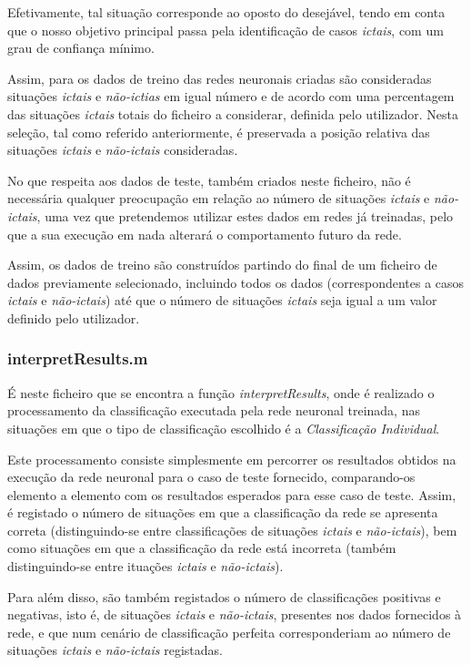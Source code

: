 \documentclass{article}
\begin{document}
Efetivamente, tal situação corresponde ao oposto do desejável, tendo em conta que o nosso objetivo principal passa pela identificação de casos \emph{ictais}, com um grau de confiança mínimo.

Assim, para os dados de treino das redes neuronais criadas são consideradas situações \emph{ictais} e \emph{não-ictias} em igual número e de acordo com uma percentagem das situações \emph{ictais} totais do ficheiro a considerar, definida pelo utilizador. Nesta seleção, tal como referido anteriormente, é preservada a posição relativa das situações \emph{ictais} e \emph{não-ictais} consideradas.

No que respeita aos dados de teste, também criados neste ficheiro, não é necessária qualquer preocupação em relação ao número de situações \emph{ictais} e \emph{não-ictais}, uma vez que pretendemos utilizar estes dados em redes já treinadas, pelo que a sua execução em nada alterará o comportamento futuro da rede.

Assim, os dados de treino são construídos partindo do final de um ficheiro de dados previamente selecionado, incluindo todos os dados (correspondentes a casos \emph{ictais} e \emph{não-ictais}) até que o número de situações \emph{ictais} seja igual a um valor definido pelo utilizador.

\subsubsection{interpretResults.m}

É neste ficheiro que se encontra a função \emph{interpretResults}, onde é realizado o processamento da classificação executada pela rede neuronal treinada, nas situações em que o tipo de classificação escolhido é a \emph{Classificação Individual}.

Este processamento consiste simplesmente em percorrer os resultados obtidos na execução da rede neuronal para o caso de teste fornecido, comparando-os elemento a elemento com os resultados esperados para esse caso de teste. Assim, é registado o número de situações em que a classificação da rede se apresenta correta (distinguindo-se entre classificações de situações \emph{ictais} e \emph{não-ictais}), bem como situações em que a classificação da rede está incorreta (também distinguindo-se entre ituações \emph{ictais} e \emph{não-ictais}).

Para além disso, são também registados o número de classificações positivas e negativas, isto é, de situações \emph{ictais} e \emph{não-ictais}, presentes nos dados fornecidos à rede, e que num cenário de classificação perfeita corresponderiam ao número de situações \emph{ictais} e \emph{não-ictais} registadas.
\end{document}
